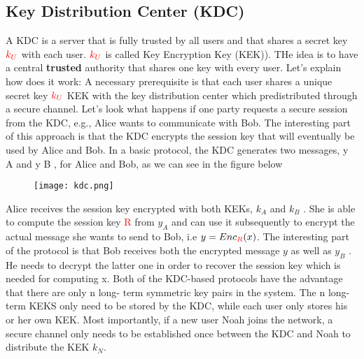 \documentclass{article}
\begin{document}
\subsection{Key Distribution Center (KDC)}
A KDC is a server that is fully trusted by all users and that shares a secret key $\textcolor{red}{k_U}$ with each user. $\textcolor{red}{k_U}$ is called Key Encryption Key (KEK)).
THe idea is to have a central \textbf{trusted} authority that shares one key with every user.
Let's explain how does it work:
\newline A necessary prerequisite is that each user shares a unique secret key $\textcolor{red}{k_U}$ KEK  with the key distribution center which predistributed through a secure channel. Let’s
look what happens if one party requests a secure session from the KDC, e.g., Alice
wants to communicate with Bob. The interesting part of this approach is that the
KDC encrypts the session key that will eventually be used by Alice and Bob. In
a basic protocol, the KDC generates two messages, y A and y B , for Alice and Bob, as we can see in the figure below
\begin{figure} [H]
    \centering
    \texttt{[image: kdc.png]}
\end{figure}
Alice receives the session key encrypted with both KEKs, $k_A$ and $k_B$ . She is able
to compute the session key \textcolor{red}{R} from $y_A$ and can use it subsequently to encrypt the
actual message she wants to send to Bob, i.e $y = Enc_{\textcolor{red}{R}}(x)$. The interesting part of the protocol is that
Bob receives both the encrypted message $y$ as well as $y_B$ . He needs to decrypt the
latter one in order to recover the session key which is needed for computing x.
Both of the KDC-based protocols have the advantage that there are only n long-
term symmetric key pairs in the system. The n long-term KEKS only
need to be stored by the KDC, while each user only stores his or her own KEK. Most importantly, if a new user Noah joins the network, a secure channel only needs to
be established once between the KDC and Noah to distribute the KEK $k_N$.
\end{document}
